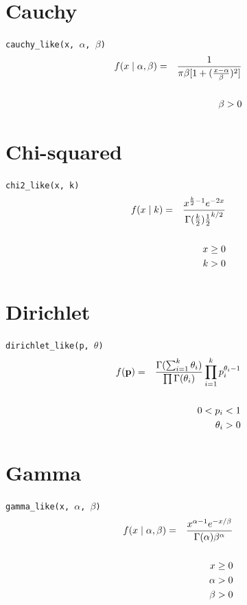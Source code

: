 \documentclass[]{book}
\begin{document}
\section*{Cauchy}
\verb=cauchy_like(x, =$\alpha$\verb=, =$\beta$\verb=)=
\begin{eqnarray*}
f(x \mid \alpha, \beta) &=& \frac{1}{\pi \beta [1 + (\frac{x-\alpha}{\beta})^2]} \\
\vspace{2cm}\\
&& \beta > 0
\end{eqnarray*}

\section*{Chi-squared}
\verb=chi2_like(x, k)=
\begin{eqnarray*}
f(x \mid k) &=& \frac{x^{\frac{k}{2}-1}e^{-2x}}{\Gamma(\frac{k}{2}) \frac{1}{2}^{k/2}} \\
\vspace{2cm}\\
&& x \ge 0 \\
&& k > 0
\end{eqnarray*}

\section*{Dirichlet}
\verb=dirichlet_like(p, =$\theta$\verb=)=
\begin{eqnarray*}
f(\mathbf{p}) &=& \frac{\Gamma(\sum_{i=1}^k \theta_i)}{\prod \Gamma(\theta_i)} \prod_{i=1}^k p_i^{\theta_i - 1}\\
\vspace{2cm}\\
&& 0 < p_i < 1 \\
&& \theta_i > 0
\end{eqnarray*}

\section*{Gamma}
\verb=gamma_like(x, =$\alpha$\verb=, =$\beta$\verb=)=
\begin{eqnarray*}
f(x \mid \alpha, \beta) &=& \frac{x^{\alpha-1}e^{-x/\beta}}{\Gamma(\alpha) \beta^{\alpha}} \\
\vspace{2cm}\\
&& x \ge 0 \\
&& \alpha > 0 \\
&& \beta > 0
\end{eqnarray*}
\end{document}
